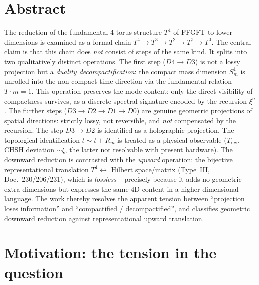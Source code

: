 

\section*{Abstract}

The reduction of the fundamental 4-torus structure $T^4$ of FFGFT to lower
dimensions is examined as a formal chain $T^4 \to T^3 \to T^2 \to T^1 \to T^0$.
The central claim is that this chain does \emph{not} consist of steps of the
same kind. It splits into two qualitatively distinct operations. The first step
($D4\!\to\!D3$) is not a lossy projection but a \emph{duality decompactification}:
the compact mass dimension $S^1_m$ is unrolled into the non-compact time
direction via the fundamental relation $\tilde{T}\cdot m = 1$. This operation
preserves the mode content; only the direct visibility of compactness survives,
as a discrete spectral signature encoded by the recursion $\xi^n$. The further
steps ($D3\!\to\!D2\!\to\!D1\!\to\!D0$) are genuine geometric projections of
spatial directions: strictly lossy, not reversible, and \emph{not} compensated
by the recursion. The step $D3\!\to\!D2$ is identified as a holographic
projection. The topological identification $t\sim t+R_m$ is treated as a
physical observable ($T_\text{rev}$, CHSH deviation $\sim\xi$, the latter not resolvable with present hardware). The downward reduction is contrasted with the
\emph{upward} operation: the bijective representational translation
$T^4 \leftrightarrow$ Hilbert space/matrix (Type~III, Doc.~230/206/231), which is
\emph{lossless} -- precisely because it adds no geometric extra dimensions but
expresses the same 4D content in a higher-dimensional language. The work thereby
resolves the apparent tension between ``projection loses information'' and
``compactified / decompactified'', and classifies geometric downward reduction
against representational upward translation.

\section{Motivation: the tension in the question}

